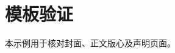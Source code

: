 \edef\TemplateClass{\noexpand\documentclass[fontset=windows,campus=harbin,
  \TemplateGuideOptions\TemplateOptions]{hithesisbook}}
\begin{document}
\frontmatter\makecover
\mainmatter\chapter{模板验证}
本示例用于核对封面、正文版心及声明页面。\nocite{smoke-reference}

\authorization
\providecommand{\ExampleAIStatement}{}
\ExampleAIStatement
\end{document}
